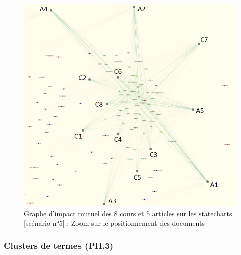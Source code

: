 \begin{figure}[htb!]
\centering
\centerline{  %
\includegraphics[scale=0.6]{4-Experiences/images/cas-6/graphe-Statecharts-Directe-core-courses-written.png}
}
\caption{Graphe d'impact mutuel des 8 cours et 5 articles sur les statecharts [scénario n°5] : Zoom sur le positionnement des documents}
\label{figure:4-cas-6-PII-GrapheCoursesZoom}
\end{figure}


\clearpage %
\newpage   %



\subsubsection{Clusters de termes (PII.3)}
\label{subsubsection:Evaluation:DeroulementExperimentations:ValidationFonctionnelle:Clusters}

